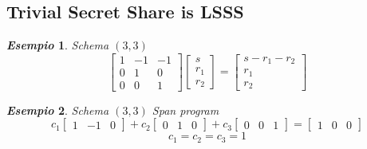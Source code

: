\documentclass{book}
\newtheorem{esempio}{\emph{Esempio}}
\begin{document}
\subsection{Trivial Secret Share is LSSS}
\begin{esempio}
    Schema \((3,3)\)
    \begin{equation*}
        \begin{bmatrix}
            1&-1&-1\\0&1&0\\0&0&1
        \end{bmatrix}\begin{bmatrix}
            s\\r_{1}\\r_{2}
        \end{bmatrix}=\begin{bmatrix}
            s-r_{1}-r_{2}\\r_{1}\\r_{2}
        \end{bmatrix}
    \end{equation*}
\end{esempio}
\begin{esempio}
    Schema \((3,3)\) Span program
    \begin{equation*}
        c_{1}\begin{bmatrix}
            1&-1&0
        \end{bmatrix}+c_{2}\begin{bmatrix}
            0&1&0
        \end{bmatrix}+c_{3}\begin{bmatrix}
            0&0&1
        \end{bmatrix}=\begin{bmatrix}
            1&0&0
        \end{bmatrix}
    \end{equation*}
    \begin{equation*}
        c_{1}=c_{2}=c_{3}=1
    \end{equation*}
\end{esempio}
\end{document}
